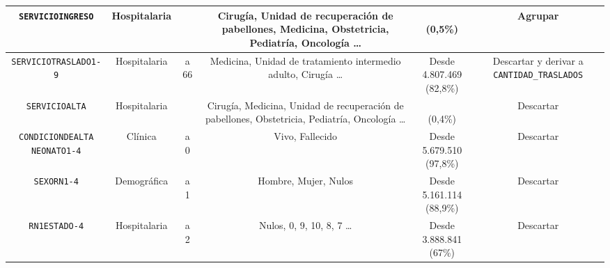 \begin{table}[htbp]
\begin{tabular}{|c|c|c|c|c|c|}
\parbox[t]{2.6cm}{\raggedright \texttt{SERVICIOINGRESO}} &
\parbox[t]{1.5cm}{\centering Hospitalaria} &
\parbox[t]{1cm}{} &
\parbox[t]{4.4cm}{\raggedright Cirugía, Unidad de recuperación de pabellones, Medicina, Obstetricia, Pediatría, Oncología \ldots} &
\parbox[t]{1.4cm}{\\(0,5\%)} &
\parbox[t]{3cm}{\raggedright Agrupar} \\ \hline

\parbox[t]{2.6cm}{\raggedright \texttt{SERVICIOTRASLADO1-9}} &
\parbox[t]{1.5cm}{\centering Hospitalaria} &
\parbox[t]{1cm}{ a 66} &
\parbox[t]{4.4cm}{\raggedright Medicina, Unidad de tratamiento intermedio adulto, Cirugía \ldots} &
\parbox[t]{1.4cm}{\centering Desde 4.807.469\\(82,8\%)} &
\parbox[t]{3cm}{\raggedright Descartar y derivar a \texttt{CANTIDAD\_TRASLADOS}} \\ \hline

\parbox[t]{2.6cm}{\raggedright \texttt{SERVICIOALTA}} &
\parbox[t]{1.5cm}{\centering Hospitalaria} &
\parbox[t]{1cm}{} &
\parbox[t]{4.4cm}{\raggedright Cirugía, Medicina, Unidad de recuperación de pabellones, Obstetricia, Pediatría, Oncología \ldots} &
\parbox[t]{1.4cm}{\\(0,4\%)} &
\parbox[t]{3cm}{\raggedright Descartar} \\ \hline

\parbox[t]{2.6cm}{\raggedright \texttt{CONDICIONDEALTA\\NEONATO1-4}} &
\parbox[t]{1.5cm}{\centering Clínica} &
\parbox[t]{1cm}{ a 0} &
\parbox[t]{4.4cm}{\raggedright Vivo, Fallecido} &
\parbox[t]{1.4cm}{\centering Desde 5.679.510\\(97,8\%)} &
\parbox[t]{3cm}{\raggedright Descartar} \\ \hline

\parbox[t]{2.6cm}{\raggedright \texttt{SEXORN1-4}} &
\parbox[t]{1.5cm}{\centering Demográfica} &
\parbox[t]{1cm}{ a 1} &
\parbox[t]{4.4cm}{\raggedright Hombre, Mujer, Nulos} &
\parbox[t]{1.4cm}{\centering Desde 5.161.114\\(88,9\%)} &
\parbox[t]{3cm}{\raggedright Descartar} \\ \hline

\parbox[t]{2.6cm}{\raggedright \texttt{RN1ESTADO-4}} &
\parbox[t]{1.5cm}{\centering Hospitalaria} &
\parbox[t]{1cm}{ a 2} &
\parbox[t]{4.4cm}{\raggedright Nulos, 0, 9, 10, 8, 7 \ldots} &
\parbox[t]{1.4cm}{\centering Desde 3.888.841\\(67\%)} &
\parbox[t]{3cm}{\raggedright Descartar} \\ \hline


\end{tabular}
\end{table}
